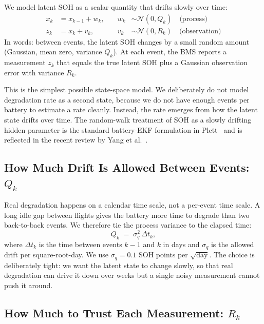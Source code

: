 \documentclass[11pt]{article}
\begin{document}
We model latent SOH as a scalar quantity that drifts slowly over time:
\begin{align}
x_k &= x_{k-1} + w_k, &\quad w_k &\sim \mathcal{N}(0, Q_k) \quad \text{(process)} \label{eq:state_eq}\\
z_k &= x_k + v_k,     &\quad v_k &\sim \mathcal{N}(0, R_k) \quad \text{(observation)} \label{eq:obs_eq}
\end{align}
In words: between events, the latent SOH changes by a small random
amount (Gaussian, mean zero, variance \(Q_k\)). At each event, the BMS
reports a measurement \(z_k\) that equals the true latent SOH plus a
Gaussian observation error with variance \(R_k\).

This is the simplest possible state-space model. We deliberately do not
model degradation rate as a second state, because we do not have enough
events per battery to estimate a rate cleanly. Instead, the rate emerges
from how the latent state drifts over time. The random-walk treatment
of SOH as a slowly drifting hidden parameter is the standard battery-EKF
formulation in Plett~\cite{plett2004c} and is reflected in the recent
review by Yang et al.~\cite{yang2021review}.

\subsection{How Much Drift Is Allowed Between Events: \texorpdfstring{$Q_k$}{Q\_k}}

Real degradation happens on a calendar time scale, not a per-event time
scale. A long idle gap between flights gives the battery more time to
degrade than two back-to-back events. We therefore tie the process
variance to the elapsed time:
\begin{equation}
Q_k \;=\; \sigma_q^{2}\,\Delta t_k,
\label{eq:Q_k}
\end{equation}
where \(\Delta t_k\) is the time between events \(k-1\) and \(k\) in
days and \(\sigma_q\) is the allowed drift per square-root-day. We use
\(\sigma_q = 0.1\) SOH points per \(\sqrt{\text{day}}\). The choice is
deliberately tight: we want the latent state to change slowly, so that
real degradation can drive it down over weeks but a single noisy
measurement cannot push it around.

\subsection{How Much to Trust Each Measurement: \texorpdfstring{$R_k$}{R\_k}}
\end{document}
